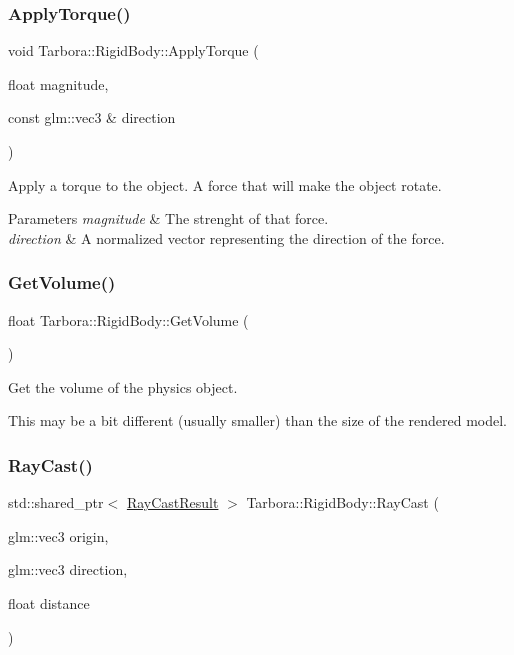 \subsubsection{\texorpdfstring{Apply\+Torque()}{ApplyTorque()}}
{\footnotesize\ttfamily void Tarbora\+::\+Rigid\+Body\+::\+Apply\+Torque (\begin{DoxyParamCaption}\item[{float}]{magnitude,  }\item[{const glm\+::vec3 \&}]{direction }\end{DoxyParamCaption})}



Apply a torque to the object. A force that will make the object rotate. 


\begin{DoxyParams}{Parameters}
{\em magnitude} & The strenght of that force. \\
\hline
{\em direction} & A normalized vector representing the direction of the force. \\
\hline
\end{DoxyParams}
\mbox{\label{classTarbora_1_1RigidBody_a04d55e1752e8b1c31a08b460d971ec09}} 
\subsubsection{\texorpdfstring{Get\+Volume()}{GetVolume()}}
{\footnotesize\ttfamily float Tarbora\+::\+Rigid\+Body\+::\+Get\+Volume (\begin{DoxyParamCaption}{ }\end{DoxyParamCaption})\hspace{0.3cm}{\ttfamily [inline]}}



Get the volume of the physics object. 

This may be a bit different (usually smaller) than the size of the rendered model. \mbox{\label{classTarbora_1_1RigidBody_afcb7edde5f51569c31385ccb75728e8a}} 
\subsubsection{\texorpdfstring{Ray\+Cast()}{RayCast()}}
{\footnotesize\ttfamily std\+::shared\+\_\+ptr$<$ \hyperlink{structTarbora_1_1RayCastResult}{Ray\+Cast\+Result} $>$ Tarbora\+::\+Rigid\+Body\+::\+Ray\+Cast (\begin{DoxyParamCaption}\item[{glm\+::vec3}]{origin,  }\item[{glm\+::vec3}]{direction,  }\item[{float}]{distance }\end{DoxyParamCaption})}



